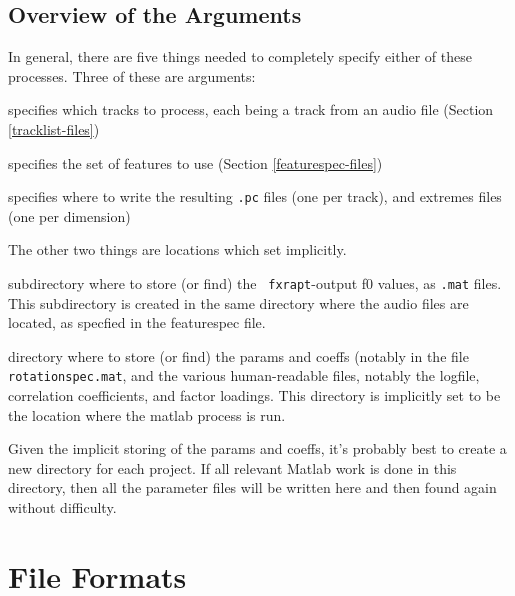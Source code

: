 \documentclass[11pt]{article}
\begin{document}
\subsection{Overview of the Arguments}   \label{arguments}

In general, there are five things needed to completely specify either
of these processes.  Three of these are arguments:

\begin{description}  \setlength{\itemsep}{0pt}\setlength{\parskip}{0pt}
\item[tracklist] specifies which tracks to process, each being a
  track from an audio file (Section \ref{tracklist-files})
\item[featurespec file]  specifies the set of features to use (Section \ref{featurespec-files})
\item[output dir] specifies where to write the resulting {\tt .pc}
  files (one per track), and extremes files (one per dimension)
\end{description}

The other two things are locations which set implicitly. 

\begin{description}  \setlength{\itemsep}{0pt}\setlength{\parskip}{0pt}
\item[pitch cache] subdirectory where to store (or find) the {\tt
  fxrapt}-output f0 values, as {\tt .mat} files.  This subdirectory is
  created in the same directory where the audio files are located, as
  specfied in the featurespec file.
\item[parameter dir] directory where to store (or find) the params and
  coeffs (notably in the file {\tt rotationspec.mat}, and the various
  human-readable files, notably the logfile, correlation coefficients,
  and factor loadings.  This directory is implicitly set to be the
  location where the matlab process is run.
\end{description}

Given the implicit storing of the params and coeffs, it's probably
best to create a new directory for each project.  If all relevant
Matlab work is done in this directory, then all the parameter files
will be written here and then found again without difficulty.


\section{File Formats}       
\end{document}
